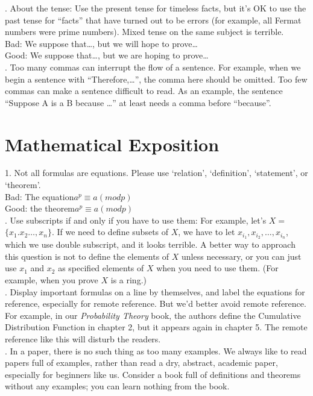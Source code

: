 \documentclass[12pt,a4paper]{article}  %
\theoremstyle{definition}
\numberwithin{equation}{section}
\begin{document}
. About the tense: Use the present tense for timeless facts, but it's OK to use the past tense for ``facts'' that have turned out to be errors (for example, all Fermat numbers were prime numbers). Mixed tense on the same subject is terrible.\\
\indent Bad: We suppose that\dots, but we will hope to prove\dots\\
\indent Good: We suppose that\dots, but we are hoping to prove\dots\\

. Too many commas can interrupt the flow of a sentence. For example, when we begin a sentence with ``Therefore,\dots'', the comma here should be omitted. Too few commas can make a sentence difficult to read. As an example, the sentence ``Suppose A is a B because \dots'' at least needs a comma before ``because''.


\section{Mathematical Exposition} 
1. Not all formulas are equations. Please use `relation', `definition', `statement', or `theorem'.\\
\indent Bad: The equation\quad\(a^{p}\equiv a(mod p)\)\\
\indent Good: the theorem\quad\(a^{p}\equiv a(mod p)
\) \\ 

. Use subscripts if and only if you have to use them: For example, let's $X$$=${\(\{x_1.x_2\dots, x_n\}\)}. If we need to define subsets of $X$, we have to let {\(x_{i_1}, x_{i_2}, \dots, x_{i_n}\)}, which we use double subscript, and it looks terrible. A better way to approach this question is not to define the elements of $X$ unless necessary, or you can just use $x$$_1$ and $x$$_2$ as specified elements of $X$ when you need to use them. (For example, when you prove $X$ is a ring.)\\

. Display important formulas on a line by themselves, and label the equations for reference, especially for remote reference. But we'd better avoid remote reference. For example, in our \textit{Probability Theory} book, the authors define the Cumulative Distribution Function in chapter 2, but it appears again in chapter 5. The remote reference like this will disturb the readers. \\

. In a paper, there is no such thing as too many examples. We always like to read papers full of examples, rather than read a dry, abstract, academic paper, especially for beginners like us. Consider a book full of definitions and theorems without any examples; you can learn nothing from the book.\\
\end{document}
